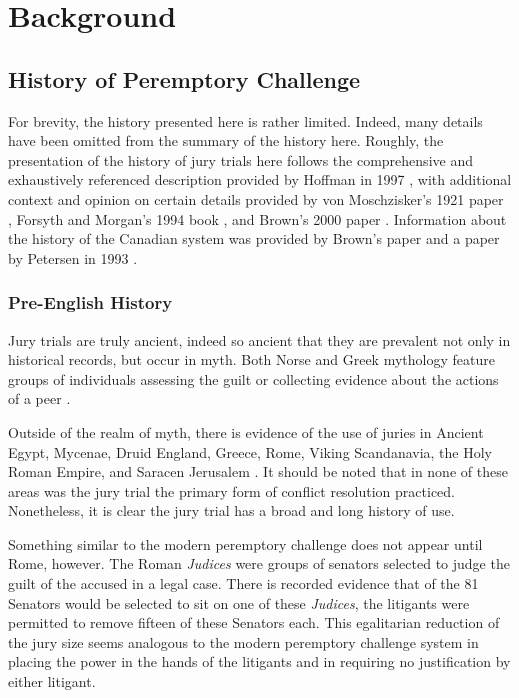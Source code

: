 \documentclass{article}
\begin{document}
\section{Background} \label{sec:background}

\subsection{History of Peremptory Challenge} \label{subsec:history}

For brevity, the history presented here is rather limited. Indeed, many details have been omitted from the summary of the history
here. Roughly, the presentation of the history of jury trials here follows the comprehensive and exhaustively referenced
description provided by Hoffman in 1997 \cite{hoffman1997}, with additional context and opinion on certain details provided by von
Moschzisker's 1921 paper \cite{vonmosch1921}, Forsyth and Morgan's 1994 book \cite{forsythhistory}, and Brown's 2000 paper
\cite{brown2000}. Information about the history of the Canadian system was provided by Brown's paper \cite{brown2000} and a paper
by Petersen in 1993 \cite{petersen1993}.

\subsubsection{Pre-English History}

Jury trials are truly ancient, indeed so ancient that they are prevalent not only in historical records, but occur in myth. Both
Norse and Greek mythology feature groups of individuals assessing the guilt or collecting evidence about the actions of a peer
\cite{hoffman1997}.

Outside of the realm of myth, there is evidence of the use of juries in Ancient Egypt, Mycenae, Druid England, Greece, Rome,
Viking Scandanavia, the Holy Roman Empire, and Saracen Jerusalem \cite{hoffman1997}. It should be noted that in none of these
areas was the jury trial the primary form of conflict resolution practiced. Nonetheless, it is clear the jury trial has a broad
and long history of use.

Something similar to the modern peremptory challenge does not appear until Rome, however. The Roman \textit{Judices} were groups
of senators selected to judge the guilt of the accused in a legal case. There is recorded evidence that of the 81 Senators would
be selected to sit on one of these \textit{Judices}, the litigants were permitted to remove fifteen of these Senators each. This
egalitarian reduction of the jury size seems analogous to the modern peremptory challenge system in placing the power in the hands
of the litigants and in requiring no justification by either litigant.
\end{document}
